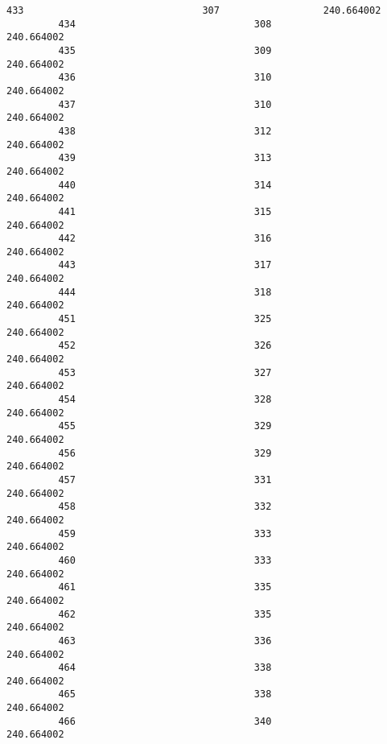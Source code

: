 \documentclass[11pt]{article}
\begin{document}
\begin{Verbatim}[commandchars=\\\{\}]
         433                               307                  240.664002   
         434                               308                  240.664002   
         435                               309                  240.664002   
         436                               310                  240.664002   
         437                               310                  240.664002   
         438                               312                  240.664002   
         439                               313                  240.664002   
         440                               314                  240.664002   
         441                               315                  240.664002   
         442                               316                  240.664002   
         443                               317                  240.664002   
         444                               318                  240.664002   
         451                               325                  240.664002   
         452                               326                  240.664002   
         453                               327                  240.664002   
         454                               328                  240.664002   
         455                               329                  240.664002   
         456                               329                  240.664002   
         457                               331                  240.664002   
         458                               332                  240.664002   
         459                               333                  240.664002   
         460                               333                  240.664002   
         461                               335                  240.664002   
         462                               335                  240.664002   
         463                               336                  240.664002   
         464                               338                  240.664002   
         465                               338                  240.664002   
         466                               340                  240.664002   
         

\end{Verbatim}
\end{document}
